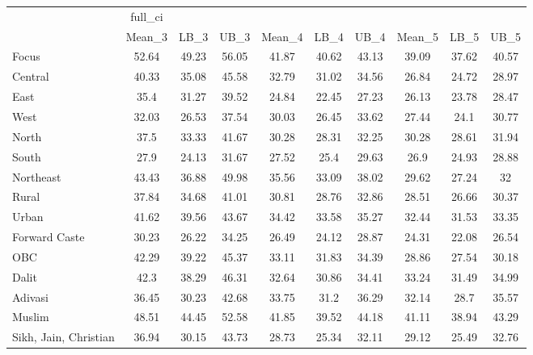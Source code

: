 \begin{tabular}{l*{9}{c}}
\toprule
                    &     full\_ci&            &            &            &            &            &            &            &            \\
                    &      Mean\_3&        LB\_3&        UB\_3&      Mean\_4&        LB\_4&        UB\_4&      Mean\_5&        LB\_5&        UB\_5\\
\midrule
Focus               &       52.64&       49.23&       56.05&       41.87&       40.62&       43.13&       39.09&       37.62&       40.57\\
Central             &       40.33&       35.08&       45.58&       32.79&       31.02&       34.56&       26.84&       24.72&       28.97\\
East                &        35.4&       31.27&       39.52&       24.84&       22.45&       27.23&       26.13&       23.78&       28.47\\
West                &       32.03&       26.53&       37.54&       30.03&       26.45&       33.62&       27.44&        24.1&       30.77\\
North               &        37.5&       33.33&       41.67&       30.28&       28.31&       32.25&       30.28&       28.61&       31.94\\
South               &        27.9&       24.13&       31.67&       27.52&        25.4&       29.63&        26.9&       24.93&       28.88\\
Northeast           &       43.43&       36.88&       49.98&       35.56&       33.09&       38.02&       29.62&       27.24&          32\\
Rural               &       37.84&       34.68&       41.01&       30.81&       28.76&       32.86&       28.51&       26.66&       30.37\\
Urban               &       41.62&       39.56&       43.67&       34.42&       33.58&       35.27&       32.44&       31.53&       33.35\\
Forward Caste       &       30.23&       26.22&       34.25&       26.49&       24.12&       28.87&       24.31&       22.08&       26.54\\
OBC                 &       42.29&       39.22&       45.37&       33.11&       31.83&       34.39&       28.86&       27.54&       30.18\\
Dalit               &        42.3&       38.29&       46.31&       32.64&       30.86&       34.41&       33.24&       31.49&       34.99\\
Adivasi             &       36.45&       30.23&       42.68&       33.75&        31.2&       36.29&       32.14&        28.7&       35.57\\
Muslim              &       48.51&       44.45&       52.58&       41.85&       39.52&       44.18&       41.11&       38.94&       43.29\\
Sikh, Jain, Christian&       36.94&       30.15&       43.73&       28.73&       25.34&       32.11&       29.12&       25.49&       32.76\\
\bottomrule
\end{tabular}
